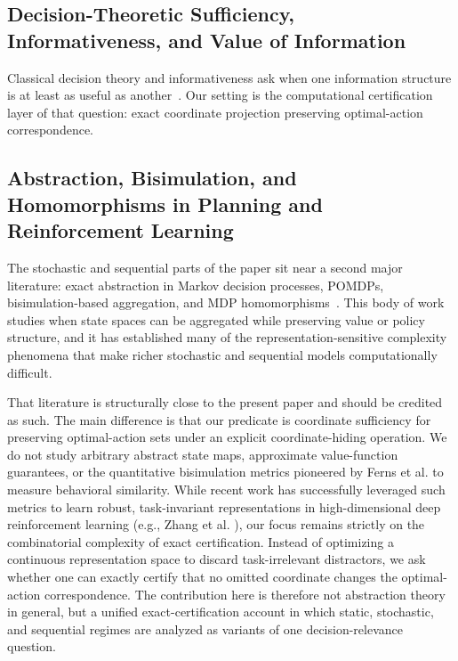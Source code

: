 \subsection{Decision-Theoretic Sufficiency, Informativeness, and Value of Information}

Classical decision theory and informativeness ask when one information structure is at least as useful as another~\cite{blackwell1953equivalent,savage1954foundations,raiffa1961applied,howard1966information}. Our setting is the computational certification layer of that question: exact coordinate projection preserving optimal-action correspondence.

\subsection{Abstraction, Bisimulation, and Homomorphisms in Planning and Reinforcement Learning}

The stochastic and sequential parts of the paper sit near a second major literature: exact abstraction in Markov decision processes, POMDPs, bisimulation-based aggregation, and MDP homomorphisms~\cite{papadimitriou1987mdp,littman1998probplanning,mundhenk2000mdp,givan2003equivalence,ravindran2004algebraic}. This body of work studies when state spaces can be aggregated while preserving value or policy structure, and it has established many of the representation-sensitive complexity phenomena that make richer stochastic and sequential models computationally difficult.

That literature is structurally close to the present paper and should be credited as such. The main difference is that our predicate is coordinate sufficiency for preserving optimal-action sets under an explicit coordinate-hiding operation. We do not study arbitrary abstract state maps, approximate value-function guarantees, or the quantitative bisimulation metrics pioneered by Ferns et al. \cite{ferns2004metrics} to measure behavioral similarity. While recent work has successfully leveraged such metrics to learn robust, task-invariant representations in high-dimensional deep reinforcement learning (e.g., Zhang et al. \cite{zhang2021learning}), our focus remains strictly on the combinatorial complexity of exact certification. Instead of optimizing a continuous representation space to discard task-irrelevant distractors, we ask whether one can exactly certify that no omitted coordinate changes the optimal-action correspondence. The contribution here is therefore not abstraction theory in general, but a unified exact-certification account in which static, stochastic, and sequential regimes are analyzed as variants of one decision-relevance question.

